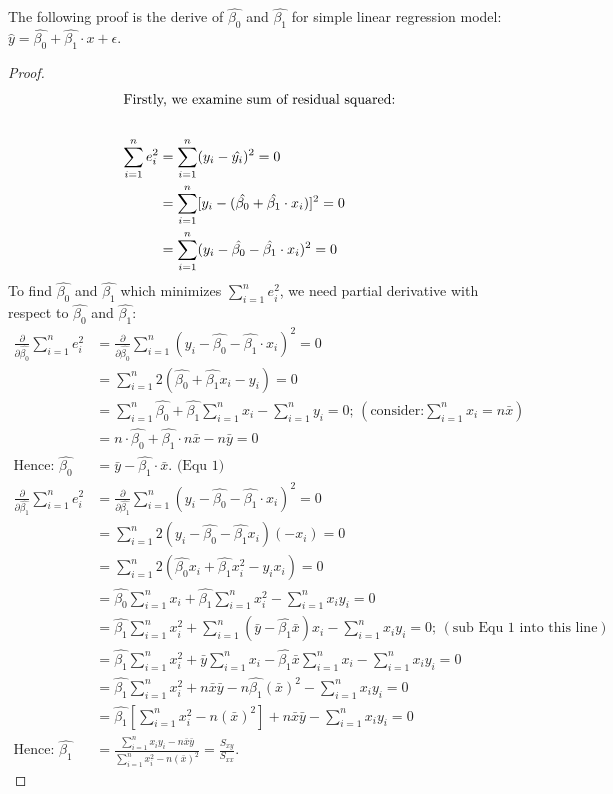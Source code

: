 The following proof is the derive of $\hat{\beta_0}$ and $\hat{\beta_1}$ for simple linear regression model: $\hat{y} = \hat{\beta_0} + \hat{\beta_1} \cdot x + \epsilon$.

\begin{proof}
\begin{align*}
\intertext{Firstly, we examine sum of residual squared:}\\
\sum_{i=1}^{n}e_i^2 &= \sum_{i=1}^{n}(y_i - \hat{y_i})^2 = 0\\
&= \sum_{i=1}^{n}[y_i - (\hat{\beta_0} + \hat{\beta_1} \cdot x_i)]^2 = 0\\
&= \sum_{i=1}^{n}(y_i - \hat{\beta_0} - \hat{\beta_1} \cdot x_i)^2 = 0\\
\end{align*}
To find $\hat{\beta_0}$ and $\hat{\beta_1}$ which minimizes $\sum_{i=1}^{n}e_i^2$, we need partial derivative with respect to $\hat{\beta_0}$ and $\hat{\beta_1}$:
\begin{align*}
\frac{\partial}{\partial \hat{\beta_0}}\sum_{i=1}^{n}e_i^2 &= \frac{\partial}{\partial \hat{\beta_0}}\sum_{i=1}^{n}(y_i - \hat{\beta_0} - \hat{\beta_1} \cdot x_i)^2 = 0\\
&= \sum_{i=1}^{n}2(\hat{\beta_0} + \hat{\beta_1}x_i - y_i) = 0\\
&= \sum_{i=1}^{n}\hat{\beta_0} + \hat{\beta_1}\sum_{i=1}^{n}x_i - \sum_{i=1}^{n}y_i = 0 \text{; } (\text{consider:} \sum_{i=1}^{n}x_i = n\bar{x})\\
&= n\cdot\hat{\beta_0} + \hat{\beta_1}\cdot n \bar{x} - n\bar{y} = 0\\
\text{Hence: } \hat{\beta_0} &= \bar{y} - \hat{\beta_1}\cdot \bar{x}. \text{ (Equ 1)}\\
\frac{\partial}{\partial \hat{\beta_1}}\sum_{i=1}^{n}e_i^2 &= \frac{\partial}{\partial \hat{\beta_1}}\sum_{i=1}^{n}(y_i - \hat{\beta_0} - \hat{\beta_1} \cdot x_i)^2 = 0\\
&= \sum_{i=1}^{n}2(y_i - \hat{\beta_0} - \hat{\beta_1}x_i)(-x_i)=0\\
&= \sum_{i=1}^{n}2(\hat{\beta_0}x_i + \hat{\beta_1}x_i^2 - y_ix_i)=0\\
&= \hat{\beta_0}\sum_{i=1}^{n}x_i + \hat{\beta_1}\sum_{i=1}^{n}x_i^2 - \sum_{i=1}^{n}x_iy_i = 0\\
&= \hat{\beta_1}\sum_{i=1}^{n}x_i^2 + \sum_{i=1}^{n}(\bar{y} - \hat{\beta_1}\bar{x})x_i - \sum_{i=1}^{n}x_iy_i = 0 \text{; } (\text{sub Equ 1 into this line})\\
&= \hat{\beta_1}\sum_{i=1}^{n}x_i^2 + \bar{y}\sum_{i=1}^{n}x_i - \hat{\beta_1}\bar{x}\sum_{i=1}^{n}x_i - \sum_{i=1}^{n}x_iy_i = 0\\
&= \hat{\beta_1}\sum_{i=1}^{n}x_i^2 + n\bar{x}\bar{y} - n\hat{\beta_1}(\bar{x})^2 - \sum_{i=1}^{n}x_iy_i = 0\\
&= \hat{\beta_1}[\sum_{i=1}^{n}x_i^2 - n(\bar{x})^2] + n\bar{x}\bar{y} - \sum_{i=1}^{n}x_iy_i = 0\\
\text{Hence: } \hat{\beta_1} &= \frac{\sum_{i=1}^{n}x_iy_i - n\bar{x}\bar{y}}{\sum_{i=1}^{n}x_i^2 - n(\bar{x})^2} = \frac{S_{xy}}{S_{xx}}.
\end{align*}
\end{proof}

